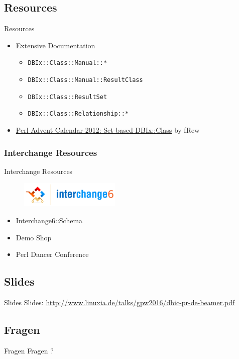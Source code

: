 \subsection{Resources}
\begin{frame}[fragile]{Resources}
\begin{itemize}
\item Extensive Documentation
\begin{itemize}
\item \verb|DBIx::Class::Manual::*|
\item \verb|DBIx::Class::Manual::ResultClass|
\item \verb|DBIx::Class::ResultSet|
\item \verb|DBIx::Class::Relationship::*|
\end{itemize}
\item \href{http://www.perladvent.org/2012/2012-12-21.html}
{Perl Advent Calendar 2012: Set-based DBIx::Class}
by fRew
\end{itemize}
\end{frame}

\subsubsection{Interchange Resources}

\begin{frame}{Interchange Resources}
\begin{figure}[!ht]
\centering
\includegraphics[width=0.4\linewidth]{img/interchange6-logo-v2.png}
\end{figure}
\begin{itemize}
\item Interchange6::Schema
\item Demo Shop
\item Perl Dancer Conference
\end{itemize}
\end{frame}

\subsection{Slides}

\begin{frame}{Slides}
Slides:
\url{http://www.linuxia.de/talks/gpw2016/dbic-pr-de-beamer.pdf}
\end{frame}

\subsection{Fragen}

\begin{frame}{Fragen}
\centering
Fragen ?
\end{frame}



